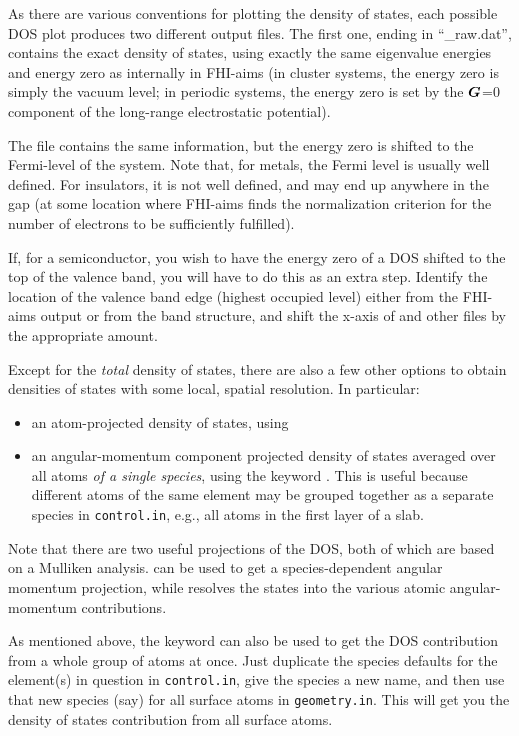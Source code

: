 As there are various conventions for plotting the density of
states, each possible DOS plot produces two different output
files. The first one, ending in ``\_raw.dat'', contains the exact 
density of states, using exactly the  
same eigenvalue energies and energy zero as internally in FHI-aims (in cluster
systems, the energy zero is simply the vacuum level; in periodic systems, the
energy zero is set by the $\mbox{\boldmath$G$}$=0 component of the long-range electrostatic
potential). 

The file  contains
the same information, but the energy zero is shifted to the
Fermi-level of the system. Note that, for metals, the Fermi level is
usually well defined. For insulators, it is not well defined, and may
end up anywhere in the gap (at some location where FHI-aims finds the
normalization criterion for the number of electrons to be sufficiently
fulfilled).

If, for a semiconductor, you wish to have the energy zero of a DOS
shifted to the top of the valence band, you will have to do this as an 
extra step. Identify the location of the valence band edge (highest
occupied level) either from the FHI-aims output or from the band
structure, and shift the x-axis of  and
other files by the appropriate amount. 

Except for the \emph{total} density of states, there are also a few
other options to obtain densities of states with some local, spatial
resolution. In particular:
\begin{itemize}
  \item an atom-projected density of states, using 
  \item an angular-momentum component projected density of states
    averaged over all atoms \emph{of a single species}, using the
    keyword  
    . This is useful because different 
    atoms of the same element may be grouped together as a separate
    species in \texttt{control.in}, e.g., all atoms in the first layer
    of a slab.
\end{itemize}

Note that there are two useful projections of the DOS, both of which are based
on a Mulliken analysis. 
 can be used to  
get a species-dependent angular momentum projection, while
  resolves the
states into the various  
atomic angular-momentum contributions.

As mentioned above, the  keyword can also be used
to get the DOS contribution from a whole group of atoms at once. Just
duplicate the species defaults for the element(s) in question in
\texttt{control.in}, give the species a new name, and then use that
new species (say) for all surface atoms in \texttt{geometry.in}. This
will get you the density of states contribution from all surface atoms.


